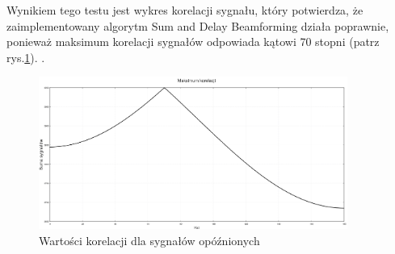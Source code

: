 \documentclass[eng,printmode]{mgr}
\begin{document}
Wynikiem tego testu jest wykres korelacji sygnału, który potwierdza, że zaimplementowany algorytm Sum and Delay Beamforming działa poprawnie, ponieważ maksimum korelacji sygnałów odpowiada kątowi 70 stopni (patrz rys.\ref{fig-korelacja}). .

\begin{figure}[!ht]

    \centering

  \includegraphics[width=0.9\textwidth, angle=0]{suma_opoznienie.png}

    \caption{Wartości korelacji dla sygnałów opóźnionych}
 \label{fig-korelacja}
    

\end{figure}


\end{document}
